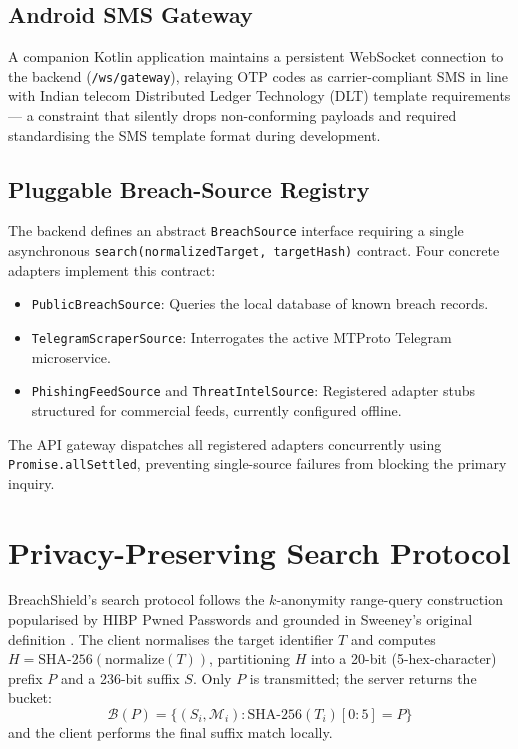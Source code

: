\documentclass[conference]{IEEEtran}
\begin{document}
\subsection{Android SMS Gateway}
A companion Kotlin application maintains a persistent WebSocket connection to the backend (\texttt{/ws/gateway}), relaying OTP codes as carrier-compliant SMS in line with Indian telecom Distributed Ledger Technology (DLT) template requirements --- a constraint that silently drops non-conforming payloads and required standardising the SMS template format during development.

\subsection{Pluggable Breach-Source Registry}
The backend defines an abstract \texttt{BreachSource} interface requiring a single asynchronous \texttt{search(normalizedTarget, targetHash)} contract. Four concrete adapters implement this contract:
\begin{itemize}
    \item \texttt{PublicBreachSource}: Queries the local database of known breach records.
    \item \texttt{TelegramScraperSource}: Interrogates the active MTProto Telegram microservice.
    \item \texttt{PhishingFeedSource} and \texttt{ThreatIntelSource}: Registered adapter stubs structured for commercial feeds, currently configured offline.
\end{itemize}
The API gateway dispatches all registered adapters concurrently using \texttt{Promise.allSettled}, preventing single-source failures from blocking the primary inquiry.

\section{Privacy-Preserving Search Protocol}
\label{sec:protocol}
BreachShield's search protocol follows the $k$-anonymity range-query construction popularised by HIBP Pwned Passwords \cite{li2019protocols} and grounded in Sweeney's original definition \cite{sweeney2002k}. The client normalises the target identifier $T$ and computes $H = \text{SHA-256}(\text{normalize}(T))$, partitioning $H$ into a 20-bit (5-hex-character) prefix $P$ and a 236-bit suffix $S$. Only $P$ is transmitted; the server returns the bucket:
\begin{equation}
\mathcal{B}(P) = \{(S_i, \mathcal{M}_i) : \text{SHA-256}(T_i)[0:5] = P\}
\end{equation}
and the client performs the final suffix match locally.
\end{document}
